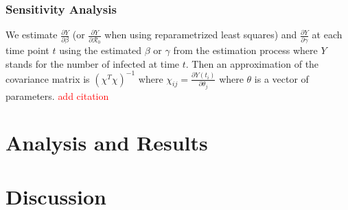 \documentclass[12pt]{article}
\newcommand{\com}[1]{\textcolor{red}{ #1}}
\newcommand{\rr}{\ensuremath{\mathcal{R}_0}}
\begin{document}
\subsubsection{Sensitivity Analysis}\label{sensitivity-analysis}

We estimate \(\frac{\partial Y}{\partial \beta}\) (or
\(\frac{\partial Y}{\partial \rr}\) when using reparametrized least squares) and \(\frac{\partial Y}{\partial \gamma}\) at each time point \(t\) using the estimated \(\beta\) or \(\gamma\) from the estimation process where $Y$ stands for the number of infected at time $t$. Then an approximation of the covariance matrix is \((\chi^T \chi)^{-1}\) where \(\chi_{ij} = \frac{ \partial Y(t_i)}{ \partial \theta_j}\) where \(\theta\) is a vector of parameters. \com{add citation}







\section{Analysis and Results}
\label{sec:results}

\section{Discussion}
\label{sec:dis}


\label{sec:details}





\end{document}
